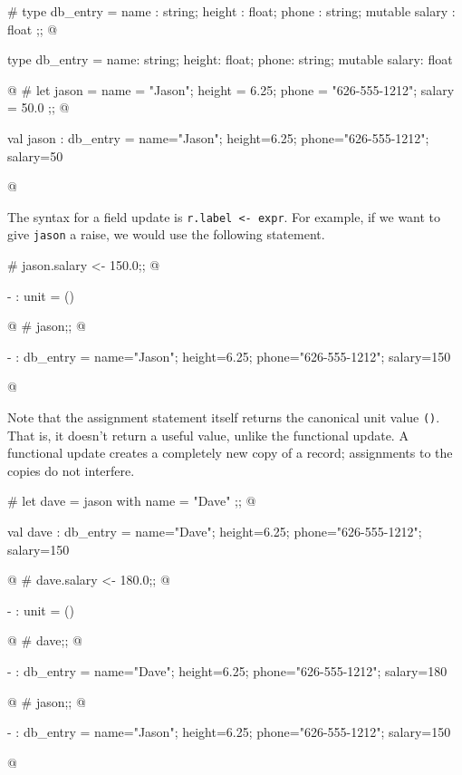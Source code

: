 \begin{ocaml}
# type db_entry =
     { name : string;
       height : float;
       phone : string;
       mutable salary : float
     };;
@
\begin{topoutput}
type db_entry =
  { name: string;
    height: float;
    phone: string;
    mutable salary: float }
\end{topoutput}
@
# let jason =
    { name = "Jason";
      height = 6.25;
      phone = "626-555-1212";
      salary = 50.0
    };;
@
\begin{topoutput}
val jason : db_entry =
  {name="Jason"; height=6.25; phone="626-555-1212"; salary=50}
\end{topoutput}
@
\end{ocaml}
%
\label{keyword:<-(record-field-assignment)}
The syntax for a field update is \hbox{\lstinline/r.label <- expr/}.  For example,
if we want to give \hbox{\lstinline/jason/} a raise, we would use the following statement.

\begin{ocaml}
# jason.salary <- 150.0;;
@
\begin{topoutput}
- : unit = ()
\end{topoutput}
@
# jason;;
@
\begin{topoutput}
- : db_entry = {name="Jason"; height=6.25; phone="626-555-1212"; salary=150}
\end{topoutput}
@
\end{ocaml}
%
Note that the assignment statement itself returns the canonical unit
value \hbox{\lstinline/()/}.  That is, it doesn't return a useful value, unlike
the functional update.  A functional update creates a completely new
copy of a record; assignments to the copies do not interfere.

\begin{ocaml}
# let dave = { jason with name = "Dave" };;
@
\begin{topoutput}
val dave : db_entry =
  {name="Dave"; height=6.25; phone="626-555-1212"; salary=150}
\end{topoutput}
@
# dave.salary <- 180.0;;
@
\begin{topoutput}
- : unit = ()
\end{topoutput}
@
# dave;;
@
\begin{topoutput}
- : db_entry = {name="Dave"; height=6.25; phone="626-555-1212"; salary=180}
\end{topoutput}
@
# jason;;
@
\begin{topoutput}
- : db_entry = {name="Jason"; height=6.25; phone="626-555-1212"; salary=150}
\end{topoutput}
@
\end{ocaml}

